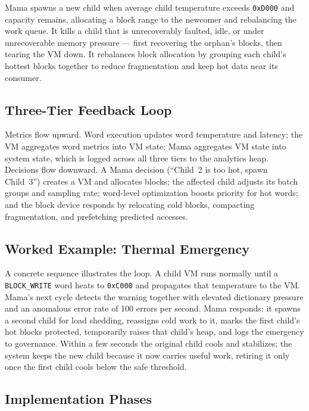 Mama spawns a new child when average child temperature exceeds \texttt{0xD000}
and capacity remains, allocating a block range to the newcomer and rebalancing
the work queue. It kills a child that is unrecoverably faulted, idle, or
under unrecoverable memory pressure --- first recovering the orphan's blocks,
then tearing the VM down. It rebalances block allocation by grouping each
child's hottest blocks together to reduce fragmentation and keep hot data near
its consumer.

\subsection{Three-Tier Feedback Loop}

Metrics flow upward. Word execution updates word temperature and latency; the VM
aggregates word metrics into VM state; Mama aggregates VM state into system
state, which is logged across all three tiers to the analytics heap. Decisions
flow downward. A Mama decision (``Child~2 is too hot, spawn Child~3'') creates a
VM and allocates blocks; the affected child adjusts its batch groups and
sampling rate; word-level optimization boosts priority for hot words; and the
block device responds by relocating cold blocks, compacting fragmentation, and
prefetching predicted accesses.

\subsection{Worked Example: Thermal Emergency}

A concrete sequence illustrates the loop. A child VM runs normally until a
\texttt{BLOCK\_WRITE} word heats to \texttt{0xC000} and propagates that
temperature to the VM. Mama's next cycle detects the warning together with
elevated dictionary pressure and an anomalous error rate of 100 errors per
second. Mama responds: it spawns a second child for load shedding, reassigns
cold work to it, marks the first child's hot blocks protected, temporarily
raises that child's heap, and logs the emergency to governance. Within a few
seconds the original child cools and stabilizes; the system keeps the new child
because it now carries useful work, retiring it only once the first child cools
below the safe threshold.

\subsection{Implementation Phases}

